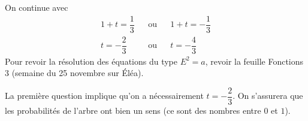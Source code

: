 {\begin{enumerate}
		On continue avec
			\begin{align*}
				1+t = \dfrac13 && \text{ou} && 1+t = -\dfrac13 \\
				t = -\dfrac23 && \text{ou} && t = -\dfrac43
			\end{align*}
		Pour revoir la résolution des équations du type $E^2 = a$, revoir la feuille Fonctions 3 (semaine du 25 novembre sur Éléa).
		
		La première question implique qu'on a nécessairement $t=-\dfrac23$.
		On s'assurera que les probabilités de l'arbre ont bien un sens (ce sont des nombres entre $0$ et $1$).
	\end{enumerate}

}


